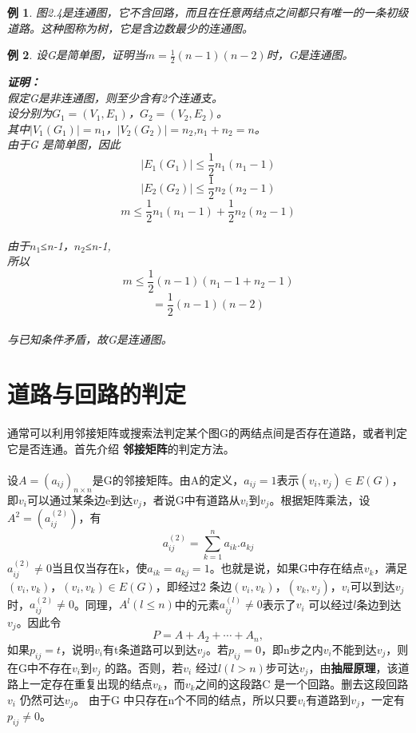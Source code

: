 \documentclass[11pt,a4paper,openany]{book}
\newtheorem{sample}{\textbf{例}}[section]
\begin{document}
\begin{sample}\K
图2.4是连通图，它不含回路，而且在任意两结点之间都只有唯一的一条初级道路。这种图称为树，它是含边数最少的连通图。
\end{sample}
\begin{sample}\K
设G是简单图，证明当$m=\frac{1}{2}(n-1)(n-2)$时，G是连通图。\\
\begin{adjustwidth}{0.62cm}{0.62cm}
\textbf{证明：}\\
假定G是非连通图，则至少含有2个连通支。\\
设分别为$G_1=(V_1,E_1)$，$G_2=(V_2,E_2)$。\\
其中$|V_1 (G_1 )|=n_1$，$|V_2 (G_2 )|=n_2$,$n_1+n_2=n$。\\
由于G 是简单图，因此$$|E_1 (G_1 )|\leq\frac{1}{2} n_1(n_1-1)$$$$|E_2 (G_2 )|\leq\frac{1}{2}n_2 (n_2-1)$$$$m\leq\frac{1}{2} n_1(n_1-1)+\frac{1}{2}n_2(n_2-1)$$\\
由于$n_1$≤n-1，$n_2$≤n-1,\\
所以$$m\leq\frac{1}{2}(n-1)(n_1-1+n_2-1)$$$$=\frac{1}{2}(n-1)(n-2)$$\\
与已知条件矛盾，故G是连通图。\\
\end{adjustwidth}
\end{sample}

\section{道路与回路的判定}
\paragraph{}通常可以利用邻接矩阵或搜索法判定某个图G的两结点间是否存在道路，或者判定它是否连通。首先介绍\textbf{ 邻接矩阵}的判定方法。
\paragraph{}设$A=(a_{ij})_{n\times n}$是G的邻接矩阵。由A的定义，$a_{ij}=1$表示$(v_i,v_j )\in E(G)$，即$v_i$可以通过某条边e到达$v_j$，者说G中有道路从$v_i$到$v_j$。根据矩阵乘法，设$A^2=(a_{ij}^{(2)})$，有
\begin{displaymath}
a_{ij}^{(2)}=\sum_{k=1}^{n}a_{ik}.a_{kj}
\end{displaymath}
$a_{ij}^{(2)}\neq 0$当且仅当存在k，使$a_{ik}=a_{kj}=1$。也就是说，如果G中存在结点$v_k$，满足$(v_i,v_k )$，$(v_i,v_k )\in E(G)$，即经过2 条边$(v_i,v_k)$，$(v_k,v_j)$，$v_i$可以到达$v_j$时，$a_{ij}^{(2)}\neq 0$。同理，$A^l(l≤n)$中的元素$a_{ij}^{(l)}\neq0$表示了$v_i$ 可以经过$l$条边到达$v_j$。因此令$$P=A+A_2+\cdots+A_n,$$如果$p_{ij}=t$，说明$v_i$有t条道路可以到达$v_j$。若$p_{ij}=0$，即n步之内$v_i$不能到达$v_j$，则在G中不存在$v_i$到$v_j$ 的路。否则，若$v_i$ 经过$l(l>n)$步可达$v_j$，由\textbf{抽屉原理}，该道路上一定存在重复出现的结点$v_k$，而$v_k$之间的这段路C 是一个回路。删去这段回路$v_i$ 仍然可达$v_j$。 由于G 中只存在n个不同的结点，所以只要$v_i$有道路到$v_j$，一定有$p_{ij}≠0$。
\end{document}
